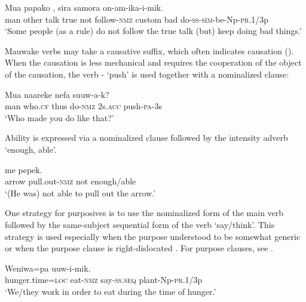 \ea%
\label{ex:5:x1250}
\gll Mua  papako     ,  sira  samora on-am-ika-i-mik. \\
     man  other  talk  true  not  follow-\textsc{nmz}  custom  bad do-\textsc{ss}-\textsc{sim}-be-Np-\textsc{pr}.1/3p \\
\glt `Some people (as a rule) do not follow the true talk (but) keep doing bad things.'
\z

Mauwake verbs may take a causative suffix, which often indicates causation (). When the causation is less mechanical and requires the cooperation of the object of the causation, the verb - `push' is used together with a nominalized clause:

\ea%
\label{ex:5:x1252}
\gll Mua  naareke     nefa  suuw-a-k? \\
     man  who.\textsc{cf}  thus  do-\textsc{nmz}  2s.\textsc{acc}  push-\textsc{pa}-3s \\
\glt `Who made you do like that?'
\z

Ability is expressed via a nominalized clause followed by the intensity adverb  `enough, able'.

\ea%
\label{ex:5:x1251}
\gll {}   me  pepek. \\
     arrow  pull.out-\textsc{nmz}  not  enough/able \\
\glt `(He was) not able to pull out the arrow.'
\z

One strategy for purposives is to use the nominalized form of the main verb followed by the same-subject sequential form  of the verb `say/think'. This strategy is used especially when the purpose understood to be somewhat generic  or when the purpose clause is right-dislocated . For purpose clauses, see .

\ea%
\label{ex:5:x1253}
\gll Weniwa=pa     uuw-i-mik. \\
     hunger.time=\textsc{loc}  eat-\textsc{nmz}  say-\textsc{ss}.\textsc{seq}  plant-Np-\textsc{pr}.1/3p \\
\glt `We/they work in order to eat during the time of hunger.'
\z


